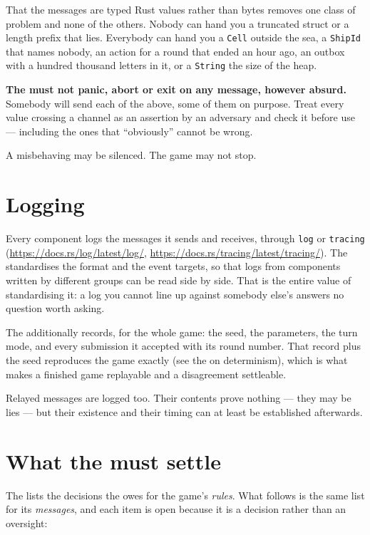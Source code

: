 \documentclass{article}
\begin{document}
That the messages are typed Rust values rather than bytes removes one class of problem and none of
the others. Nobody can hand you a truncated struct or a length prefix that lies. Everybody can hand
you a \texttt{Cell} outside the sea, a \texttt{ShipId} that names nobody, an action for a round
that ended an hour ago, an outbox with a hundred thousand letters in it, or a \texttt{String} the
size of the heap.

\textbf{The \admiralty{} must not panic, abort or exit on any message, however absurd.} Somebody
will send each of the above, some of them on purpose. Treat every value crossing a channel as an
assertion by an adversary and check it before use --- including the ones that ``obviously'' cannot
be wrong.

A misbehaving \ship{} may be silenced. The game may not stop.

\newpage
\section{Logging}
\label{proto:logging}

Every component logs the messages it sends and receives, through \texttt{log} or \texttt{tracing}
(\url{https://docs.rs/log/latest/log/}, \url{https://docs.rs/tracing/latest/tracing/}). The \WG{}
standardises the format and the event targets, so that logs from components written by different
groups can be read side by side. That is the entire value of standardising it: a log you cannot
line up against somebody else's answers no question worth asking.

The \admiralty{} additionally records, for the whole game: the seed, the parameters, the turn mode,
and every submission it accepted with its round number. That record plus the seed reproduces the
game exactly (see the \MD{} on determinism), which is what makes a finished game replayable and a
disagreement settleable.

Relayed messages are logged too. Their contents prove nothing --- they may be lies --- but their
existence and their timing can at least be established afterwards.

\newpage
\section{What the \WG{} must settle}
\label{proto:todo}

The \MD{} lists the decisions the \WG{} owes for the game's \emph{rules}. What follows is the same
list for its \emph{messages}, and each item is open because it is a decision rather than an
oversight:
\end{document}
